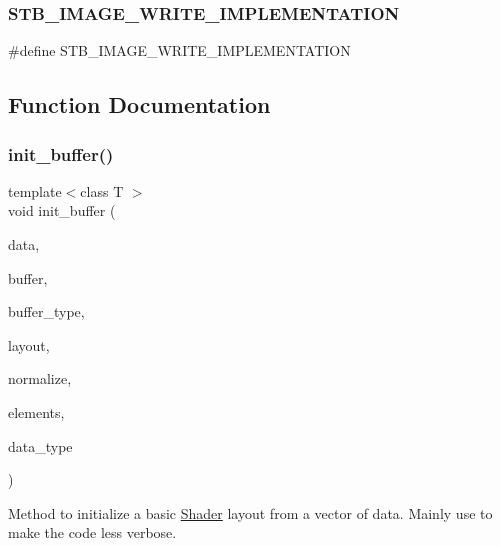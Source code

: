 \subsubsection{\texorpdfstring{S\+T\+B\+\_\+\+I\+M\+A\+G\+E\+\_\+\+W\+R\+I\+T\+E\+\_\+\+I\+M\+P\+L\+E\+M\+E\+N\+T\+A\+T\+I\+ON}{STB\_IMAGE\_WRITE\_IMPLEMENTATION}}
{\footnotesize\ttfamily \#define S\+T\+B\+\_\+\+I\+M\+A\+G\+E\+\_\+\+W\+R\+I\+T\+E\+\_\+\+I\+M\+P\+L\+E\+M\+E\+N\+T\+A\+T\+I\+ON}



\subsection{Function Documentation}
\mbox{\label{OpenGL-Wrappers_8cpp_a236f522805b8430f9089798521afe030}} 
\subsubsection{\texorpdfstring{init\+\_\+buffer()}{init\_buffer()}}
{\footnotesize\ttfamily template$<$class T $>$ \\
void init\+\_\+buffer (\begin{DoxyParamCaption}\item[{vector$<$ T $>$}]{data,  }\item[{G\+Luint}]{buffer,  }\item[{G\+Lenum}]{buffer\+\_\+type,  }\item[{G\+Luint}]{layout,  }\item[{G\+Lboolean}]{normalize,  }\item[{G\+Luint}]{elements,  }\item[{G\+Lenum}]{data\+\_\+type }\end{DoxyParamCaption})\hspace{0.3cm}{\ttfamily [inline]}}

Method to initialize a basic \mbox{\hyperlink{classShader}{Shader}} layout from a vector of data. Mainly use to make the code less verbose. \mbox{\label{OpenGL-Wrappers_8cpp_a65c85386ba2869ab5ac496344019f122}} 
